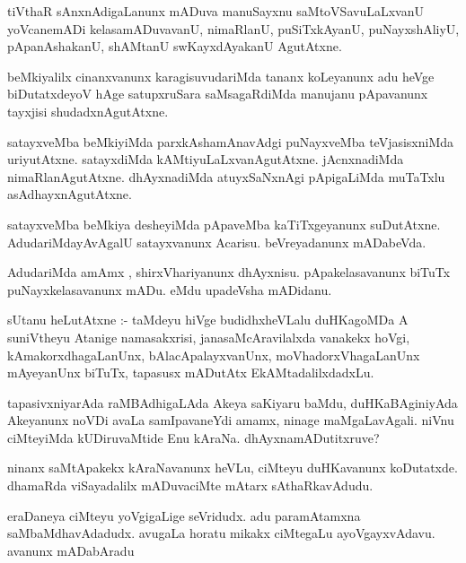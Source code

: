 \documentclass{article}
\begin{document}
\begin{mn}
tiVthaR sAnxnAdigaLanunx mADuva manuSayxnu saMtoVSavuLaLxvanU yoVcanemADi kelasamADuvavanU, 
nimaRlanU, puSiTxkAyanU, puNayxshAliyU, pApanAshakanU, shAMtanU swKayxdAyakanU AgutAtxne.
\end{mn}

\begin{mn}
beMkiyalilx cinanxvanunx karagisuvudariMda tananx koLeyanunx adu heVge biDutatxdeyoV 
hAge satupxruSara saMsagaRdiMda manujanu pApavanunx tayxjisi shudadxnAgutAtxne.
\end{mn}

\begin{mn}
satayxveMba  beMkiyiMda parxkAshamAnavAdgi  puNayxveMba teVjasisxniMda uriyutAtxne.  
satayxdiMda kAMtiyuLaLxvanAgutAtxne.  jAcnxnadiMda nimaRlanAgutAtxne.  
dhAyxnadiMda atuyxSaNxnAgi pApigaLiMda muTaTxlu asAdhayxnAgutAtxne.
\end{mn}

\begin{mn}
satayxveMba beMkiya desheyiMda pApaveMba kaTiTxgeyanunx suDutAtxne.  
AdudariMdayAvAgalU satayxvanunx Acarisu.  beVreyadanunx mADabeVda.  
\end{mn}

\begin{mn}
AdudariMda amAmx , shirxVhariyanunx dhAyxnisu. pApakelasavanunx  biTuTx 
puNayxkelasavanunx mADu. eMdu upadeVsha mADidanu.
\end{mn}

\begin{mn}
sUtanu heLutAtxne :- taMdeyu hiVge budidhxheVLalu duHKagoMDa A suniVtheyu Atanige 
namasakxrisi, janasaMcAravilalxda vanakekx hoVgi, kAmakorxdhagaLanUnx, bAlacApalayxvanUnx,  
moVhadorxVhagaLanUnx mAyeyanUnx biTuTx, tapasusx mADutAtx EkAMtadalilxdadxLu.  
\end{mn}

\begin{mn}
tapasivxniyarAda raMBAdhigaLAda Akeya saKiyaru baMdu, duHKaBAginiyAda Akeyanunx  
noVDi avaLa samIpavaneYdi amamx, ninage maMgaLavAgali.  niVnu ciMteyiMda 
kUDiruvaMtide Enu kAraNa. dhAyxnamADutitxruve? 
\end{mn}

\begin{mn}
ninanx saMtApakekx kAraNavanunx heVLu, ciMteyu duHKavanunx koDutatxde. 
dhamaRda viSayadalilx mADuvaciMte mAtarx sAthaRkavAdudu. 
\end{mn}

\begin{mn}
eraDaneya ciMteyu yoVgigaLige seVridudx. adu paramAtamxna saMbaMdhavAdadudx. 
avugaLa horatu  mikakx ciMtegaLu ayoVgayxvAdavu. avanunx mADabAradu 
\end{mn}
\end{document}
